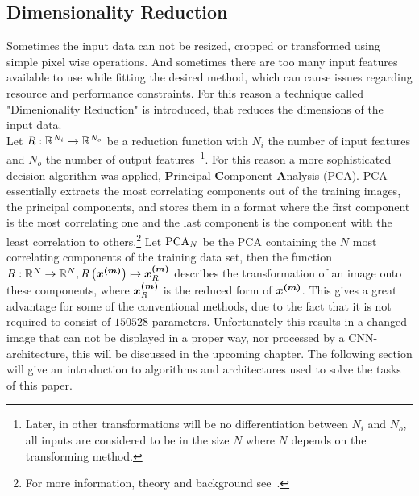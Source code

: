 \subsection{Dimensionality Reduction}\label{subsec:dimensionality-reduction}
Sometimes the input data can not be resized, cropped or transformed using simple pixel wise operations.
And sometimes there are too many input features available to use while fitting the desired method, which can cause issues regarding resource and performance constraints.
For this reason a technique called "Dimenionality Reduction" is introduced, that reduces the dimensions of the input data.\\
Let $R: \mathbb{R}^{N_i} \rightarrow \mathbb{R}^{N_o}$ be a reduction function with $N_i$ the number of input features and $N_o$ the number of output features~\footnote{
    Later, in other transformations will be no differentiation between $N_i$ and $N_o$, all inputs are considered to be in the size $N$ where $N$ depends on the transforming method.
}.
For this reason a more sophisticated decision algorithm was applied, \textbf{P}rincipal \textbf{C}omponent \textbf{A}nalysis (PCA).
PCA essentially extracts the most correlating components out of the training images, the principal components, and stores them in a format where the first component is the most correlating one and the last component is the component with the least correlation to others.\footnote{
    For more information, theory and background see~\cite{pca, handsOn}.
}
Let $\text{PCA}_N$ be the PCA containing the $N$ most correlating components of the training data set, then the function $R: \mathbb{R}^{N} \rightarrow \mathbb{R}^N, R\left(\bm{x^{(m)}}\right) \mapsto \bm{x^{(m)}}_R$ describes the transformation of an image onto these components, where $\bm{x^{(m)}}_R$ is the reduced form of $\bm{x^{(m)}}$.
This gives a great advantage for some of the conventional methods, due to the fact that it is not required to consist of $150528$ parameters.
Unfortunately this results in a changed image that can not be displayed in a proper way, nor processed by a CNN-architecture, this will be discussed in the upcoming chapter.
The following section will give an introduction to algorithms and architectures used to solve the tasks of this paper.
